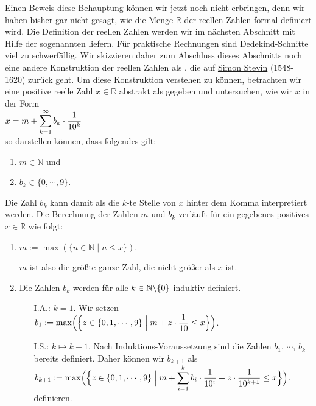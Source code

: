 Einen Beweis diese Behauptung können wir jetzt noch nicht erbringen, denn wir haben bisher gar nicht
gesagt, wie die Menge $\mathbb{R}$ der reellen Zahlen formal definiert wird.
Die Definition der reellen Zahlen werden wir im nächsten Abschnitt mit Hilfe der sogenannten
 liefern.  Für praktische Rechnungen sind Dedekind-Schnitte viel zu schwerfällig.  Wir
skizzieren  daher zum Abschluss dieses Abschnitts noch eine andere Konstruktion der reellen Zahlen als 
, die
auf \href{http://en.wikipedia.org/wiki/Simon_Stevin}{Simon Stevin} (1548-1620) zurück geht.  Um
diese Konstruktion verstehen zu können,
betrachten wir eine positive reelle Zahl $x \in \mathbb{R}$ abstrakt als gegeben und untersuchen, wie wir $x$
in der Form
\\[0.2cm]
\hspace*{1.3cm}
$\displaystyle x = m + \sum\limits_{k=1}^\infty b_k \cdot \frac{1}{10^k}$
\\[0.2cm]
so darstellen können, dass folgendes gilt:
\begin{enumerate}
\item $m \in \mathbb{N}$ \quad und
\item $b_k \in \{0,\cdots,9\}$.
\end{enumerate}
Die Zahl $b_k$ kann damit als die $k$-te Stelle von $x$ hinter dem Komma interpretiert werden.
Die Berechnung der Zahlen $m$ und $b_k$ verläuft für ein gegebenes positives $x \in \mathbb{R}$ wie folgt:
\begin{enumerate}
\item $m := \max(\{ n \in \mathbb{N} \mid n \leq x \})$.

      $m$ ist also die größte ganze Zahl, die nicht größer als $x$ ist.
\item Die Zahlen $b_k$ werden für alle $k \in \mathbb{N}\symbol{92}\{0\}$ induktiv definiert.
      \begin{enumerate}
      \item[I.A.:] $k=1$.  Wir setzen
                   \\[0.2cm]
                   \hspace*{1.3cm}
                   $\displaystyle b_1 := \max\Bigl(\Bigl\{ z \in \{ 0, 1, \cdots, 9 \} \Bigm| m + z \cdot \frac{1}{10} \leq x\Bigr\}\Bigr)$.
      \item[I.S.:] $k \mapsto k+1$.  Nach Induktions-Voraussetzung sind die Zahlen $b_1$, $\cdots$, $b_k$
                   bereits definiert.  Daher können wir $b_{k+1}$ als
                   \\[0.2cm]
                   \hspace*{1.3cm}
                   $\displaystyle b_{k+1} := \max\Bigl(\Bigl\{ z \in \{ 0, 1, \cdots, 9 \} \Bigm| m + \sum\limits_{i=1}^{k} b_i \cdot \frac{1}{10^i} + z \cdot \frac{1}{10^{k+1}}\leq x\Bigr\}\Bigr)$.
                   \\[0.2cm]
                   definieren.
      \end{enumerate}
\end{enumerate}
